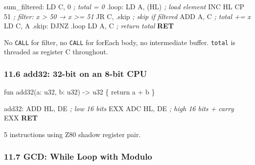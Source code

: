 \documentclass[
  11pt,
]{article}
\newenvironment{Shaded}{}{}
\newcommand{\BuiltInTok}[1]{\textcolor[rgb]{0.00,0.50,0.00}{#1}}
\newcommand{\CommentTok}[1]{\textcolor[rgb]{0.38,0.63,0.69}{\textit{#1}}}
\newcommand{\ControlFlowTok}[1]{\textcolor[rgb]{0.00,0.44,0.13}{\textbf{#1}}}
\newcommand{\DecValTok}[1]{\textcolor[rgb]{0.25,0.63,0.44}{#1}}
\newcommand{\FunctionTok}[1]{\textcolor[rgb]{0.02,0.16,0.49}{#1}}
\newcommand{\NormalTok}[1]{#1}
\newcommand{\OperatorTok}[1]{\textcolor[rgb]{0.40,0.40,0.40}{#1}}
\begin{document}
\begin{Shaded}
\begin{Highlighting}[]
\FunctionTok{sum\_filtered:}
\NormalTok{    LD C}\OperatorTok{,} \DecValTok{0}          \CommentTok{; total = 0}
\FunctionTok{.loop:}
\NormalTok{    LD A}\OperatorTok{,} \OperatorTok{(}\NormalTok{HL}\OperatorTok{)}       \CommentTok{; load element}
    \BuiltInTok{INC}\NormalTok{ HL}
\NormalTok{    CP }\DecValTok{51}            \CommentTok{; filter: x \textgreater{} 50 → x \textgreater{}= 51}
\NormalTok{    JR C}\OperatorTok{,} \OperatorTok{.}\NormalTok{skip      }\CommentTok{; skip if filtered}
    \BuiltInTok{ADD}\NormalTok{ A}\OperatorTok{,}\NormalTok{ C         }\CommentTok{; total += x}
\NormalTok{    LD C}\OperatorTok{,}\NormalTok{ A}
\FunctionTok{.skip:}
\NormalTok{    DJNZ }\OperatorTok{.}\NormalTok{loop}
\NormalTok{    LD A}\OperatorTok{,}\NormalTok{ C          }\CommentTok{; return total}
    \ControlFlowTok{RET}
\end{Highlighting}
\end{Shaded}

No \texttt{CALL} for filter, no \texttt{CALL} for forEach body, no
intermediate buffer. \texttt{total} is threaded as register C
throughout.

\subsubsection{11.6 add32: 32-bit on an 8-bit
CPU}\label{add32-32-bit-on-an-8-bit-cpu}

\begin{Shaded}
\begin{Highlighting}[]
\NormalTok{fun add32(a: u32, b: u32) {-}\textgreater{} u32 \{ return a + b \}}
\end{Highlighting}
\end{Shaded}

\begin{Shaded}
\begin{Highlighting}[]
\FunctionTok{add32:}
    \BuiltInTok{ADD}\NormalTok{ HL}\OperatorTok{,}\NormalTok{ DE      }\CommentTok{; low 16 bits}
\NormalTok{    EXX}
    \BuiltInTok{ADC}\NormalTok{ HL}\OperatorTok{,}\NormalTok{ DE      }\CommentTok{; high 16 bits + carry}
\NormalTok{    EXX}
    \ControlFlowTok{RET}
\end{Highlighting}
\end{Shaded}

5 instructions using Z80 shadow register pair.

\subsubsection{11.7 GCD: While Loop with
Modulo}\label{gcd-while-loop-with-modulo}
\end{document}
